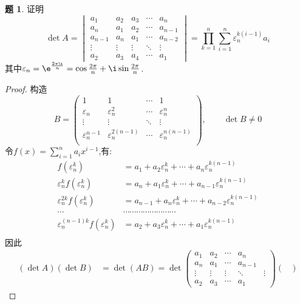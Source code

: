 \documentclass{article}
\theoremstyle{definition}
\newtheorem{exercise}{题}[section]
\begin{document}
\begin{exercise}
    证明$$\det A=\begin{vmatrix}
        a_1&a_2&a_3&\cdots&a_n\\
        a_n&a_1&a_2&\cdots&a_{n-1}\\
        a_{n-1}&a_n&a_1&\cdots&a_{n-2}\\
        \vdots&\vdots&\vdots&\ddots&\vdots\\
        a_2&a_3&a_4&\cdots&a_1
    \end{vmatrix}=\prod_{k=1}^{n}\sum_{i=1}^{n}\varepsilon_{n}^{k(i-1)}a_i$$
    其中$\varepsilon_n=\e^{\frac{2\pi\i}{n}}=\cos \frac{2\pi}{n}+\i\sin\frac{2\pi}{n}$.
\end{exercise}
\begin{proof}
    构造$$B=\begin{pmatrix}
        1&1&\cdots&1\\
        \varepsilon_n&\varepsilon_n^2&\cdots&\varepsilon_n^n\\
        \vdots&\vdots&\ddots&\vdots\\
        \varepsilon_n^{n-1}&\varepsilon_n^{2(n-1)}&\cdots&\varepsilon_n^{n(n-1)}\\
    \end{pmatrix},\qquad \det B\neq 0$$
    令$f(x)=\sum_{i=1}^n a_ix^{i-1}$,有:$$\begin{aligned}
        f(\varepsilon_n^k)&=a_1+a_2\varepsilon_n^k+\cdots+a_n\varepsilon_n^{k(n-1)}\\
        \varepsilon_n^{k} f(\varepsilon_n^k)&=a_n+a_1\varepsilon_n^k+\cdots+a_{n-1}\varepsilon_n^{k(n-1)}\\
        \varepsilon_n^{2k} f(\varepsilon_n^k)&=a_{n-1}+a_n\varepsilon_n^k+\cdots+a_{n-2}\varepsilon_n^{k(n-1)}\\
        \cdots&\cdots\cdots\cdots\cdots\cdots\cdots\cdots\cdots\\
        \varepsilon_n^{(n-1)k} f(\varepsilon_n^k)&=a_2+a_3\varepsilon_n^k+\cdots+a_1\varepsilon_n^{k(n-1)}\\
    \end{aligned}$$
    因此$$\begin{aligned}
        (\det A)(\det B)&=\det(AB)=\det \begin{pmatrix}
        a_1&a_2&\cdots&a_n\\
        a_n&a_1&\cdots&a_{n-1}\\
        \vdots&\vdots&\vdots&\ddots&\vdots\\
        a_2&a_3&\cdots&a_1
    \end{pmatrix}\begin{pmatrix}

\end{pmatrix}
\end{aligned}$$
\end{proof}
\end{document}
